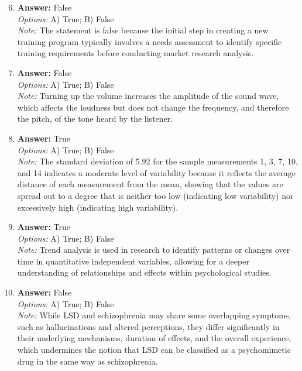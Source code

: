 \documentclass[12pt]{article}
\begin{document}
\begin{enumerate}[label=\arabic*.]
\setcounter{enumi}{5}
\item \textbf{Answer:} False
\\ \textit{Options:} A) True; B) False
\\ \textit{Note:} The statement is false because the initial step in creating a new training program typically involves a needs assessment to identify specific training requirements before conducting market research analysis.
\item \textbf{Answer:} False
\\ \textit{Options:} A) True; B) False
\\ \textit{Note:} Turning up the volume increases the amplitude of the sound wave, which affects the loudness but does not change the frequency, and therefore the pitch, of the tone heard by the listener.
\item \textbf{Answer:} True
\\ \textit{Options:} A) True; B) False
\\ \textit{Note:} The standard deviation of 5.92 for the sample measurements 1, 3, 7, 10, and 14 indicates a moderate level of variability because it reflects the average distance of each measurement from the mean, showing that the values are spread out to a degree that is neither too low (indicating low variability) nor excessively high (indicating high variability).
\item \textbf{Answer:} True
\\ \textit{Options:} A) True; B) False
\\ \textit{Note:} Trend analysis is used in research to identify patterns or changes over time in quantitative independent variables, allowing for a deeper understanding of relationships and effects within psychological studies.
\item \textbf{Answer:} False
\\ \textit{Options:} A) True; B) False
\\ \textit{Note:} While LSD and schizophrenia may share some overlapping symptoms, such as hallucinations and altered perceptions, they differ significantly in their underlying mechanisms, duration of effects, and the overall experience, which undermines the notion that LSD can be classified as a psychomimetic drug in the same way as schizophrenia.
\end{enumerate}
\end{document}

